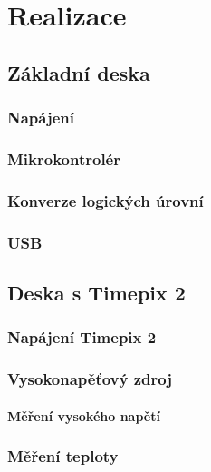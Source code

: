 \chapter{Realizace}


\section{Základní deska}
	\subsection{Napájení}
	\subsection{Mikrokontrolér}
	\subsection{Konverze logických úrovní}	
	\subsection{USB}

\section{Deska s Timepix 2}
	\subsection{Napájení Timepix 2}
	\subsection{Vysokonapěťový zdroj}
		\subsubsection{Měření vysokého napětí}
	\subsection{Měření teploty}
